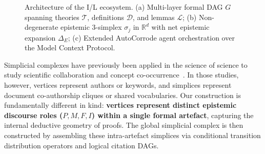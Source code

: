 \documentclass{svproc}
\begin{document}
\begin{figure}[t!]
{%
}
\caption{Architecture of the I/L ecosystem. (a) Multi-layer formal DAG $G$ spanning theories $\mathcal{T}$, definitions $\mathcal{D}$, and lemmas $\mathcal{L}$; (b) Non-degenerate epistemic 3-simplex $\sigma_j$ in $\mathbb{R}^d$ with net epistemic expansion $\Delta_E$; (c) Extended AutoCorrode agent orchestration over the Model Context Protocol.}
\label{fig:overview}
\end{figure}

Simplicial complexes have previously been applied in the science of science to study scientific collaboration and concept co-occurrence~\cite{patania_shape_2017,salnikov_co-occurrence_2018}. In those studies, however, vertices represent authors or keywords, and simplices represent document co-authorship cliques or shared vocabularies. Our construction is fundamentally different in kind:  \textbf{vertices represent distinct epistemic discourse roles ($P, M, F, I$) within a single formal artefact}, capturing the internal deductive geometry of proofs. The global simplicial complex is then constructed by assembling these intra-artefact simplices via conditional transition distribution operators and logical citation DAGs.
\end{document}
